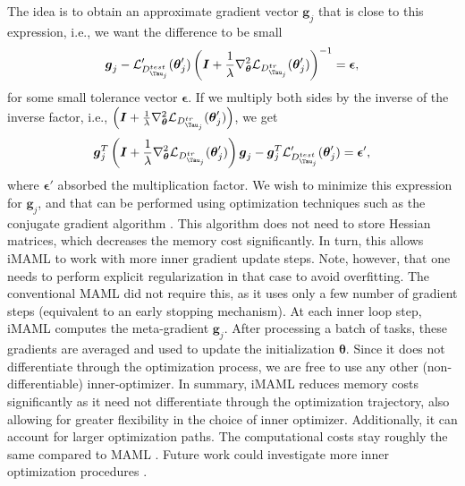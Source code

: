 The idea is to obtain an approximate gradient vector $\boldsymbol{g}_{j}$ that is close to this expression, i.e., we want the difference to be small
\begin{align}
    \boldsymbol{g}_{j} -  \mathcal{L}'_{D^{test}_{\Tau_{j}}}(\boldsymbol{\theta}'_{j}) \left( \boldsymbol{I} + \frac{1}{\lambda} \nabla^{2}_{\boldsymbol{\theta}}\mathcal{L}_{D^{tr}_{\Tau_{j}}}(\boldsymbol{\theta}'_{j}) \right)^{-1}   = \boldsymbol{\epsilon},
\end{align} for some small tolerance vector $\boldsymbol{\epsilon}$. If we multiply both sides by the inverse of the inverse factor, i.e., $\left( \boldsymbol{I} + \frac{1}{\lambda} \nabla^{2}_{\boldsymbol{\theta}}\mathcal{L}_{D^{tr}_{\Tau_{j}}}(\boldsymbol{\theta}'_{j}) \right)$, we get 
\begin{align}
    \boldsymbol{g}_{j}^{T} \left( \boldsymbol{I} + \frac{1}{\lambda} \nabla^{2}_{\boldsymbol{\theta}}\mathcal{L}_{D^{tr}_{\Tau_{j}}}(\boldsymbol{\theta}'_{j}) \right) \boldsymbol{g}_{j} - \boldsymbol{g}_{j}^{T} \mathcal{L}'_{D^{test}_{\Tau_{j}}}(\boldsymbol{\theta}'_{j}) = \boldsymbol{\epsilon}',
\end{align} where $\boldsymbol{\epsilon}'$ absorbed the multiplication factor. We wish to minimize this expression for $\boldsymbol{g}_{j}$, and that can be performed using optimization techniques such as the conjugate gradient algorithm . This algorithm does not need to store Hessian matrices, which decreases the memory cost significantly. In turn, this allows iMAML to work with more inner gradient update steps. Note, however, that one needs to perform explicit regularization in that case to avoid overfitting. The conventional MAML did not require this, as it uses only a few number of gradient steps (equivalent to an early stopping mechanism). 
At each inner loop step, iMAML computes the meta-gradient $\boldsymbol{g}_{j}$. After processing a batch of tasks, these gradients are averaged and used to update the initialization $\boldsymbol{\theta}$. Since it does not differentiate through the optimization process, we are free to use any other (non-differentiable) inner-optimizer.
In summary, iMAML reduces memory costs significantly as it need not differentiate through the optimization trajectory, also allowing for greater flexibility in the choice of inner optimizer. Additionally, it can account for larger optimization paths. The computational costs stay roughly the same compared to MAML . Future work could investigate more inner optimization procedures .

